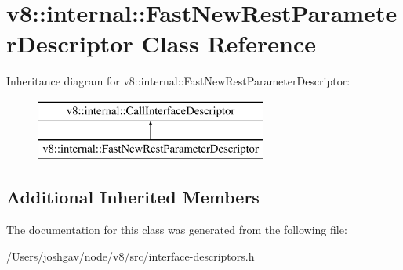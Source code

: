 \hypertarget{classv8_1_1internal_1_1_fast_new_rest_parameter_descriptor}{}\section{v8\+:\+:internal\+:\+:Fast\+New\+Rest\+Parameter\+Descriptor Class Reference}
\label{classv8_1_1internal_1_1_fast_new_rest_parameter_descriptor}
Inheritance diagram for v8\+:\+:internal\+:\+:Fast\+New\+Rest\+Parameter\+Descriptor\+:\begin{figure}[H]
\begin{center}
\leavevmode
\includegraphics[height=2.000000cm]{classv8_1_1internal_1_1_fast_new_rest_parameter_descriptor}
\end{center}
\end{figure}
\subsection*{Additional Inherited Members}


The documentation for this class was generated from the following file\+:\begin{DoxyCompactItemize}
\item 
/\+Users/joshgav/node/v8/src/interface-\/descriptors.\+h\end{DoxyCompactItemize}
